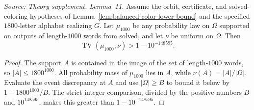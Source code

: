 \begin{lemma}
  \label{lem:total-variation-lower-bound}
  \leanok
  \textit{Source: Theory supplement, Lemma~11.}
  Assume the orbit, certificate, and solved-coloring hypotheses of
  Lemma~\ref{lem:balanced-color-lower-bound} and the specified
  \(1800\)-letter alphabet realizing \(G\). Let \(\mu_{1000}\) be any
  probability law on \(\Omega\) supported on outputs of length-\(1000\)
  words from solved, and let \(\nu\) be uniform on \(\Omega\). Then
  \[
    \operatorname{TV}(\mu_{1000},\nu)>1-10^{-148595}.
  \]
\end{lemma}
\begin{proof}
  \leanok
  The support \(A\) is contained in the image of the set of
  length-\(1000\) words, so \(|A|\le1800^{1000}\). All probability mass
  of \(\mu_{1000}\) lies in \(A\), while \(\nu(A)=|A|/|\Omega|\).
  Evaluate the event discrepancy at \(A\) and use \(|\Omega|\ge B\) to
  bound it below by \(1-1800^{1000}/B\). The strict integer
  comparison, divided by the positive numbers \(B\) and \(10^{148595}\),
  makes this greater than \(1-10^{-148595}\).
\end{proof}

